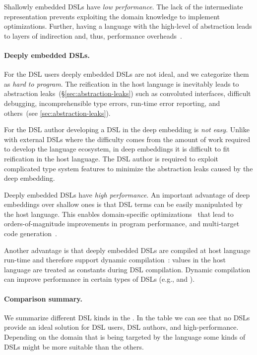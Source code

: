 Shallowly embedded DSLs have \emph{low performance}. The lack of the intermediate representation
prevents exploiting the domain knowledge to implement optimizations. Further, having
a language with the high-level of abstraction leads to layers of indirection and, thus,
performance overheads~.

\paragraph{Deeply embedded DSLs.} For the DSL users deeply embedded DSLs are not ideal,
 and we categorize them as \emph{hard to program}. The reification in the host language
 is inevitably leads to abstraction leaks~(\S \ref{sec:abstraction-leaks}) such as
 convoluted interfaces, difficult debugging, incomprehensible type errors, run-time error reporting,
 and others~(see \ref{sec:abstraction-leaks}).

For the DSL author developing a DSL in the deep embedding is \emph{not easy}. Unlike with
 external DSLs where the difficulty comes from the amount of work required to develop
 the language ecosystem, in deep embeddings it is difficult to fit reification in the host language.
 The DSL author is required to exploit complicated type system features to
 minimize the abstraction leaks caused by the deep embedding.

Deeply embedded DSLs have \emph{high performance}. An important advantage of deep embeddings over shallow ones is that DSL
  terms can be easily manipulated by the host language. This enables domain-specific
  optimizations~\cite{rompf_lightweight_2012,rompf_optimizing_2013}
  that lead to orders-of-magnitude improvements in program performance, and
  multi-target code generation~\cite{brown_heterogeneous_2011}.

Another advantage is that deeply embedded DSLs are compiled at host language run-time and therefore
 support dynamic compilation~: values in the host language are treated as constants during
 DSL compilation. Dynamic compilation can improve performance in certain types of DSLs (e.g.,  and ).


\paragraph{Comparison summary.} We summarize different DSL kinds in the . In the table
we can see that no DSLs provide an ideal solution for DSL users, DSL authors, and high-performance.
Depending on the domain that is being targeted by the language some kinds of
DSLs might be more suitable than the others.

